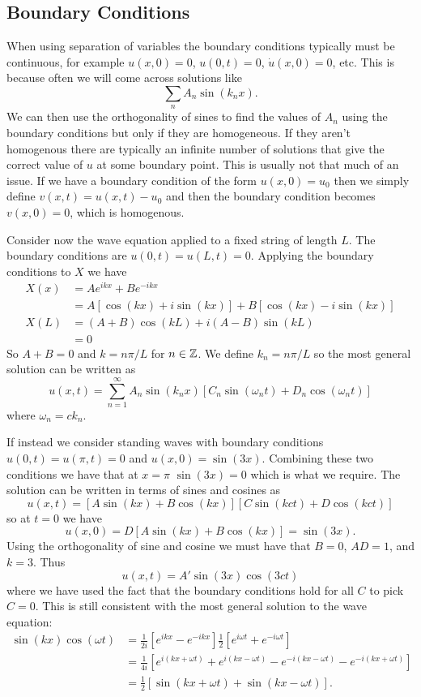 \documentclass[a4paper]{article}
\begin{document}
    \subsection{Boundary Conditions}
    When using separation of variables the boundary conditions typically must be continuous, for example \(u(x, 0) = 0\), \(u(0, t) = 0\), \(\dot{u}(x, 0) = 0\), etc.
    This is because often we will come across solutions like
    \[\sum_{n} A_n\sin(k_nx).\]
    We can then use the orthogonality of sines to find the values of \(A_n\) using the boundary conditions but only if they are homogeneous.
    If they aren't homogenous there are typically an infinite number of solutions that give the correct value of \(u\) at some boundary point.
    This is usually not that much of an issue.
    If we have a boundary condition of the form \(u(x, 0) = u_0\) then we simply define \(v(x, t) = u(x, t) - u_0\) and then the boundary condition becomes \(v(x, 0) = 0\), which is homogenous.
    
    Consider now the wave equation applied to a fixed string of length \(L\).
    The boundary conditions are \(u(0, t) = u(L, t) = 0\).
    Applying the boundary conditions to \(X\) we have
    \begin{align*}
        X(x) &= Ae^{ikx} + Be^{-ikx}\\
        &= A[\cos(kx) + i\sin(kx)] + B[\cos(kx) - i\sin(kx)]\\
        X(L) &= (A + B)\cos(kL) + i(A - B)\sin(kL)\\
        &= 0
    \end{align*}
    So \(A + B = 0\) and \(k = n\pi/L\) for \(n\in\mathbb{Z}\).
    We define \(k_n = n\pi/L\) so the most general solution can be written as
    \[u(x, t) = \sum_{n=1}^\infty A_n \sin(k_nx)[C_n\sin(\omega_n t) + D_n\cos(\omega_n t)]\]
    where \(\omega_n = ck_n\).
    
    If instead we consider standing waves with boundary conditions \(u(0, t) = u(\pi, t) = 0\) and \(u(x, 0) = \sin(3x)\).
    Combining these two conditions we have that at \(x = \pi\) \(\sin(3x) = 0\) which is what we require.
    The solution can be written in terms of sines and cosines as
    \[u(x, t) = [A\sin(kx) + B\cos(kx)][C\sin(kct) + D\cos(kct)]\]
    so at \(t = 0\) we have
    \[u(x, 0) = D[A\sin(kx) + B\cos(kx)] = \sin(3x).\]
    Using the orthogonality of sine and cosine we must have that \(B = 0\), \(AD = 1\), and \(k = 3\).
    Thus
    \[u(x, t) = A'\sin(3x)\cos(3ct)\]
    where we have used the fact that the boundary conditions hold for all \(C\) to pick \(C = 0\).
    This is still consistent with the most general solution to the wave equation:
    \begin{align*}
        \sin(kx)\cos(\omega t) &= \frac{1}{2i}[e^{ikx} - e^{-ikx}]\frac{1}{2}[e^{i\omega t} + e^{-i\omega t}]\\
        &= \frac{1}{4i}[e^{i(kx + \omega t)} + e^{i(kx - \omega t)} - e^{-i(kx - \omega t)} - e^{-i(kx + \omega t)}]\\
        &= \frac{1}{2}[\sin(kx + \omega t) + \sin(kx - \omega t)].
    \end{align*}
    
\end{document}
